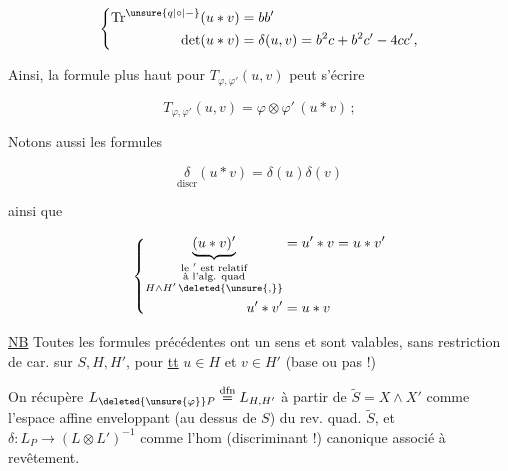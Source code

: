 
\[
\left\{\begin{aligned}
\mathrm{Tr}^{\unsure{q|\circ|-}}(u*v)&=bb'\\
\det(u*v)&=\delta(u,v)=b^2c+b^2c'-4cc',
\end{aligned}\right.
\]

Ainsi, la formule  plus haut
 pour $T_{\varphi,\varphi'}(u,v)$ peut s'écrire

\[
\boxed{T_{\varphi,\varphi'}(u,v)=\varphi\otimes\varphi'\,(u*v)}\,;
\]

Notons aussi les formules

\[
\underset{\text{discr}}{\delta}(u*v)=\delta(u)\delta(v)
\]

ainsi que

\[
\left\{\begin{aligned}
\underbrace{(u*v)'}_{\substack{\text{le $'$ est relatif}\\\text{à l'alg. quad}\\ H\wedge H'\,\deleted{\unsure{,}}}}&=u'*v=u*v'\\
u'*v'&=u*v
\end{aligned}\right.
\]

\uline{NB} Toutes les formules précédentes ont un
sens et sont valables, sans restriction
de car. sur $S,H,H'$, pour \uline{tt} $u\in H$ et $v\in H'$
(base ou pas !)

On récupère $L_{\deleted{\unsure{\varphi}}P}\overset{\text{dfn}}=L_{H,H'}$ à partir de
$\widetilde S=X\wedge X'$ comme l'espace affine enveloppant
(au dessus de $S$) du rev. quad. $\widetilde S$, et
$\delta:L_P\longrightarrow(L\otimes L')^{-1}$ comme l'hom (discriminant !) canonique associé à  revêtement.

